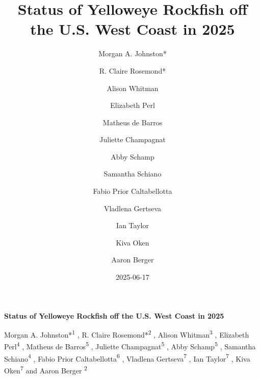 \documentclass[
]{scrartcl}
\title{Status of Yelloweye Rockfish off the U.S. West Coast in 2025}
\author{Morgan A. Johnston* \and R. Claire Rosemond* \and Alison
Whitman \and Elizabeth Perl \and Matheus de Barros \and Juliette
Champagnat \and Abby Schamp \and Samantha Schiano \and Fabio Prior
Caltabellotta \and Vladlena Gertseva \and Ian Taylor \and Kiva
Oken \and Aaron Berger}
\date{2025-06-17}
\begin{document}
  \begin{titlepage}

  \begin{minipage}[b][\textheight][s]{\textwidth}


  \raggedright




  {\huge\bfseries\nohyphens{Status of Yelloweye Rockfish off the U.S.
  West Coast in 2025}}\\[1\baselineskip]



  \vspace{1\baselineskip}


  \vspace{1\baselineskip}

   {\large{Morgan A. Johnston*}}{\textsuperscript{1}}%
  ,
   {\large{R. Claire Rosemond*}}{\textsuperscript{2}}%
  ,
   {\large{Alison Whitman}}{\textsuperscript{3}}%
  ,
   {\large{Elizabeth Perl}}{\textsuperscript{4}}%
  ,
   {\large{Matheus de Barros}}{\textsuperscript{5}}%
  ,
   {\large{Juliette Champagnat}}{\textsuperscript{5}}%
  ,
   {\large{Abby Schamp}}{\textsuperscript{5}}%
  ,
   {\large{Samantha Schiano}}{\textsuperscript{4}}%
  ,
   {\large{Fabio Prior Caltabellotta}}{\textsuperscript{6}}%
  ,
   {\large{Vladlena Gertseva}}{\textsuperscript{7}}%
  ,
   {\large{Ian Taylor}}{\textsuperscript{7}}%
  ,
   {\large{Kiva Oken}}{\textsuperscript{7}}%
  { and \large{Aaron Berger}}%
  {\textsuperscript{2}}%



\end{minipage}
\end{titlepage}
\end{document}

